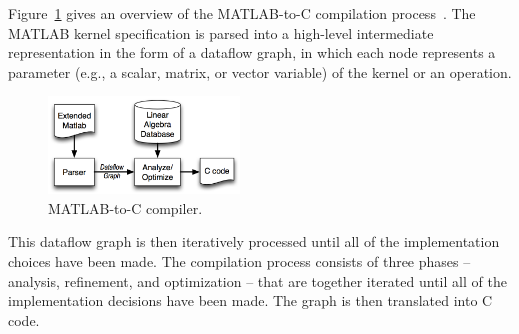 \documentclass[runningheads]{llncs}
\begin{document}
Figure~\ref{fig:compiler} gives an overview of the MATLAB-to-C compilation process~\cite{Siek}. 
The MATLAB kernel specification is parsed into a high-level intermediate
representation in the form of a dataflow graph, in which each node represents
a parameter (e.g., a scalar, matrix, or vector variable) of the kernel or an operation.
%
\begin{figure}
\centering
\includegraphics[width=2in]{figures/compile.png}
\caption{MATLAB-to-C compiler.}
\label{fig:compiler}
\vspace{-.2in}
\end{figure}
%
This dataflow graph is then iteratively processed until all of
the implementation choices have been made.  The compilation process consists
of three phases -- analysis, refinement, and optimization -- that are together
iterated until all of the implementation decisions have been made.  The graph
is then translated into C code.

%
\end{document}
